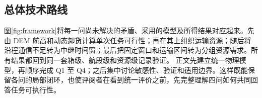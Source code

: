 \subsection{总体技术路线}
图\ref{fig:framework}将每一问尚未解决的矛盾、采用的模型及所得结果对应起来。先由 DEM 航高和动态卸货计算单次任务可行性；再在其上组织运输资源；随后将沿程通信不足转为中继时间窗；最后把固定窗口和运输区间转为分组资源需求。所有结果都回到同一套箱级、航段级和资源级记录验证。
正文先建立统一物理模型，再顺序完成 Q1 至 Q4；之后集中讨论敏感性、验证和适用边界。这样既能保留各问的局部闭环，也使评阅者在看到统一评价之前，先完整理解四问如何共同回答任务可执行性。
\FloatBarrier
